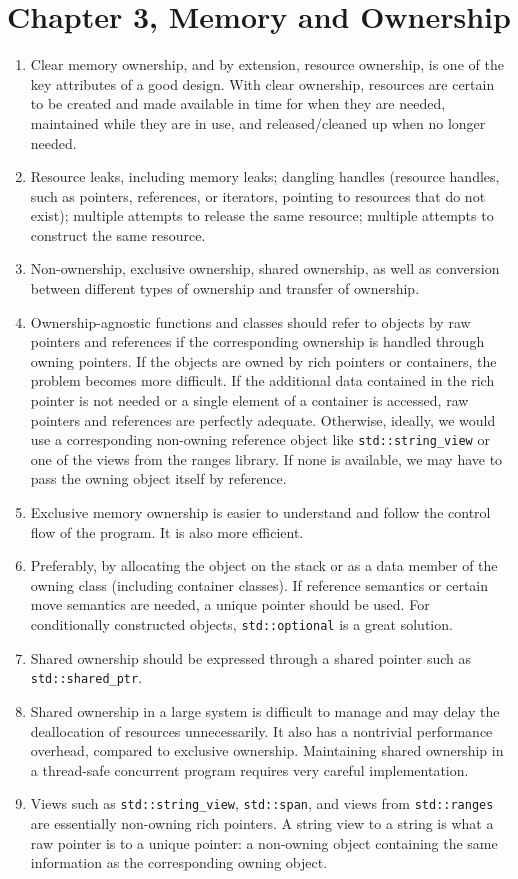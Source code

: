 \section{Chapter 3, Memory and Ownership}

\begin{enumerate}
\item
  Clear memory ownership, and by extension, resource ownership, is one of the key attributes of a good design. With clear ownership, resources are certain to be created and made available in time for when they are needed, maintained while they are in use, and released/cleaned up when no longer needed.
\item
  Resource leaks, including memory leaks; dangling handles (resource handles, such as pointers, references, or iterators, pointing to resources that do not exist); multiple attempts to release the same resource; multiple attempts to construct the same resource.
\item
  Non-ownership, exclusive ownership, shared ownership, as well as conversion between different types of ownership and transfer of ownership.
\item
  Ownership-agnostic functions and classes should refer to objects by raw pointers and references if the corresponding ownership is handled through owning pointers. If the objects are owned by rich pointers or containers, the problem becomes more difficult. If the additional data contained in the rich pointer is not needed or a single element of a container is accessed, raw pointers and references are perfectly adequate. Otherwise, ideally, we would use a corresponding non-owning reference object like \texttt{std::string\_view} or one of the views from the ranges library. If none is available, we may have to pass the owning object itself by reference.
\item
  Exclusive memory ownership is easier to understand and follow the control flow of the program. It is also more efficient.
\item
  Preferably, by allocating the object on the stack or as a data member of the owning class (including container classes). If reference semantics or certain move semantics are needed, a unique pointer should be used. For conditionally constructed objects, \texttt{std::optional} is a great solution.
\item
  Shared ownership should be expressed through a shared pointer such as \texttt{std::shared\_ptr}.
\item
  Shared ownership in a large system is difficult to manage and may delay the deallocation of resources unnecessarily. It also has a nontrivial performance overhead, compared to exclusive ownership. Maintaining shared ownership in a thread-safe concurrent program requires very careful implementation.
\item
  Views such as \texttt{std::string\_view}, \texttt{std::span}, and views from \texttt{std::ranges} are essentially non-owning rich pointers. A string view to a string is what a raw pointer is to a unique pointer: a non-owning object containing the same information as the corresponding owning object.
\end{enumerate}


